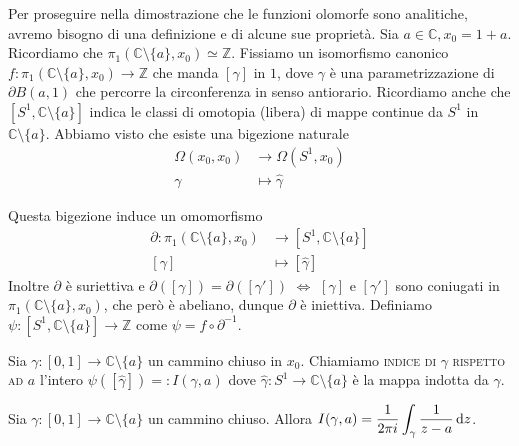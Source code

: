 Per proseguire nella dimostrazione che le funzioni olomorfe sono analitiche, avremo bisogno di una definizione e di alcune sue proprietà. Sia $a \in \mathbb{C}, x_0=1+a$. Ricordiamo che $\pi_1(\mathbb{C}\setminus\{a\}, x_0) \simeq \mathbb{Z}$. Fissiamo un isomorfismo canonico $f:\pi_1(\mathbb{C}\setminus\{a\}, x_0)\longrightarrow \mathbb{Z}$ che manda $[\gamma]$ in $1$, dove $\gamma$ è una parametrizzazione di $\partial B(a, 1)$ che percorre la circonferenza in senso antiorario.
Ricordiamo anche che $[S^1, \mathbb{C}\setminus\{a\}]$ indica le classi di omotopia (libera) di mappe continue da $S^1$ in $\mathbb{C}\setminus\{a\}$. Abbiamo visto che esiste una bigezione naturale
\begin{align*}
  \Omega(x_0, x_0) &\longrightarrow \Omega(S^1, x_0)\\
  \gamma &\longmapsto \hat{\gamma}
\end{align*}
\begin{center}
\end{center}
Questa bigezione induce un omomorfismo
\begin{align*}
  \partial:\pi_1(\mathbb{C}\setminus\{a\}, x_0) &\longrightarrow [S^1, \mathbb{C}\setminus\{a\}]\\
  [\gamma] &\longmapsto [\hat{\gamma}]
\end{align*}
Inoltre $\partial$ è suriettiva e $\partial([\gamma])=\partial([\gamma'])$ $\iff$ $[\gamma]$ e $[\gamma']$ sono coniugati in $\pi_1(\mathbb{C}\setminus\{a\}, x_0)$, che però è abeliano, dunque $\partial$ è iniettiva.
Definiamo $\psi:[S^1, \mathbb{C}\setminus\{a\}] \longrightarrow \mathbb{Z}$ come $\psi=f\circ\partial^{-1}$.

\begin{defn}
  Sia $\gamma:[0,1] \longrightarrow \mathbb{C}\setminus\{a\}$ un cammino chiuso in $x_0$. Chiamiamo \textsc{indice di $\gamma$ rispetto ad $a$} l'intero $\psi([\hat{\gamma}])=:I(\gamma, a)$ dove $\hat{\gamma}:S^1 \longrightarrow \mathbb{C}\setminus\{a\}$ è la mappa indotta da $\gamma$.
\end{defn}

\begin{thm}
  Sia $\gamma:[0,1] \longrightarrow \mathbb{C}\setminus\{a\}$ un cammino chiuso. Allora $\displaystyle I(\gamma, a)=\frac{1}{2\pi i}\int_{\gamma} \frac{1}{z-a}\mathop{}\!\mathrm{d} z$.
\end{thm}


